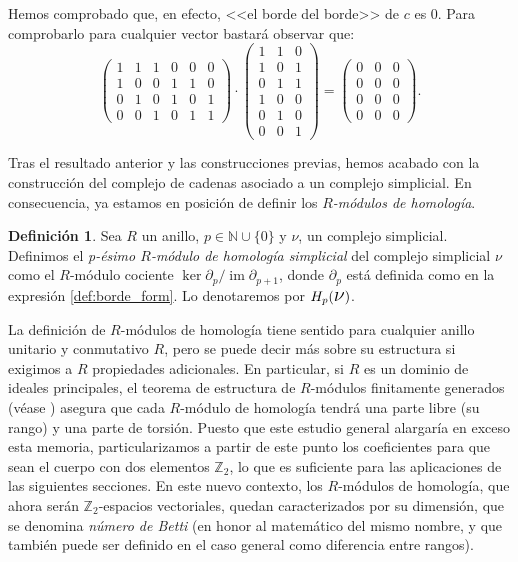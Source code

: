 \documentclass[12pt, a4paper, twoside]{book}
\numberwithin{equation}{section}
\theoremstyle{definition}
\newtheorem{defi}{Definición}[section]
\newenvironment{ejem}
  {\pushQED{\qed}\renewcommand{\qedsymbol}{$\blacktriangleleft$}\ejemplo}
  {\popQED\endejemplo}
\theoremstyle{remark}
\theoremstyle{plain}
\DeclareMathOperator{\Ima}{im}
\begin{document}
\begin{ejem}
		Hemos comprobado que, en efecto, <<el borde del borde>> de 
		$c$ es 0. Para comprobarlo para cualquier vector bastará 
		observar que:
		\begin{equation*}
		\begin{pmatrix}
				1 & 1 & 1 & 0 & 0 &0 \\
				1 & 0 & 0 & 1 & 1 &0 \\
				0 & 1 & 0 & 1 & 0 &1 \\
				0 & 0 & 1 & 0 & 1 &1
			\end{pmatrix}\cdot 
				\begin{pmatrix}
				1 & 1 & 0 \\
				1 & 0 & 1 \\
				0 & 1 & 1 \\
				1 & 0 & 0 \\
				0 & 1 & 0 \\
				0 & 0 & 1
				\end{pmatrix}
				=
				\begin{pmatrix}
				0 & 0 & 0 \\
				0 & 0 & 0 \\
				0 & 0 & 0 \\
				0 & 0 & 0 
				\end{pmatrix}.
		\end{equation*}
	\end{ejem}

	Tras el resultado anterior y las construcciones previas, hemos acabado
	con la construcción del complejo de cadenas asociado a un complejo 
	simplicial. En consecuencia, ya estamos en posición de definir los
	\emph{$R$-módulos de homología}.

	\begin{defi}
		\label{defi:homology}
		Sea $R$ un anillo, $p \in \mathbb{N}\cup\{0\}$ y 
		{\Large $\nu$}, un complejo 
		simplicial. Definimos el \textit{p-ésimo $R$-módulo de 
		homología simplicial} del complejo simplicial {\Large $\nu$} 
		como el $R$-módulo cociente $\ker \partial_{p}/
		\Ima\partial_{p+1}$, donde $\partial_{p}$ está definida como
		en la expresión \ref{def:borde_form}. Lo denotaremos por 
		$H_{p}(\text{{\Large $\nu$}})$.
	\end{defi}

	La definición de $R$-módulos de homología tiene sentido para cualquier 
	anillo unitario y conmutativo $R$, pero se puede decir más sobre su 
	estructura si exigimos a $R$ propiedades adicionales. En particular, 
	si $R$ es un dominio de ideales principales, el teorema de estructura 
	de $R$-módulos finitamente generados (véase \cite{Algebra-Elduque}) 
	asegura que cada $R$-módulo de homología tendrá una parte libre 
	(su rango) y 
	una parte de torsión. Puesto que este estudio general alargaría en 
	exceso esta memoria, particularizamos a partir de este punto los 
	coeficientes para que sean el cuerpo con dos elementos 
	$\mathbb{Z}_{2}$, 
	lo que es suficiente para las aplicaciones de las siguientes 
	secciones. En este nuevo contexto, los $R$-módulos de homología, que 
	ahora serán $\mathbb{Z}_{2}$-espacios vectoriales, quedan 
	caracterizados por su dimensión, que se denomina \emph{número de 
	Betti} (en honor al matemático del mismo nombre, y que también puede 
	ser definido en el caso general como diferencia entre rangos).
\end{document}
